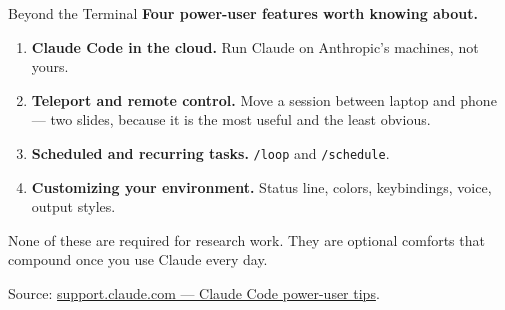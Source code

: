 \documentclass[aspectratio=169, 11pt]{beamer}
\begin{document}

\begin{frame}{Beyond the Terminal}
  \textbf{Four power-user features worth knowing about.}

  \vspace{0.7em}
  \begin{enumerate}
    \item \textbf{Claude Code in the cloud.} Run Claude on Anthropic's machines, not yours.
    \item \textbf{Teleport and remote control.} Move a session between laptop and phone --- two slides, because it is the most useful and the least obvious.
    \item \textbf{Scheduled and recurring tasks.} \texttt{/loop} and \texttt{/schedule}.
    \item \textbf{Customizing your environment.} Status line, colors, keybindings, voice, output styles.
  \end{enumerate}

  \vspace{0.7em}
  \alert{None of these are required for research work. They are optional comforts that compound once you use Claude every day.}

  \vspace{0.5em}
  {\small Source: \href{https://support.claude.com/en/articles/14554000-claude-code-power-user-tips}{support.claude.com --- Claude Code power-user tips}.}
\end{frame}

\end{document}
